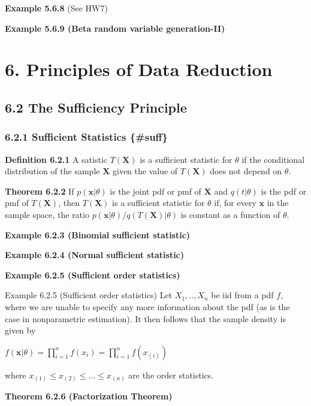 \documentclass[10pt,twocolumn,portrait]{article}
\begin{document}
\textbf{Example 5.6.8} (See HW7)

\textbf{Example 5.6.9 (Beta random variable generation-II)}

\hypertarget{principles-of-data-reduction}{%
\section{6. Principles of Data
Reduction}\label{principles-of-data-reduction}}

\hypertarget{the-sufficiency-principle}{%
\subsection{6.2 The Sufficiency
Principle}\label{the-sufficiency-principle}}

\hypertarget{Facto}{%
\subsubsection{6.2.1 Sufficient Statistics \{\#suff\}}\label{Facto}}

\textbf{Definition 6.2.1} A satistic \(T(\mathbf{X})\) is a sufficient
statistic for \(\theta\) if the conditional distribution of the sample
\(\mathbf{X}\) given the value of \(T(\mathbf{X})\) does not depend on
\(\theta\).

\textbf{Theorem 6.2.2} If \(p(\mathbf{x}|\theta)\) is the joint pdf or
pmf of \(\mathbf{X}\) and \(q(t|\theta)\) is the pdf or pmf of
\(T(\mathbf{X})\), then \(T(\mathbf{X})\) is a sufficient statistic for
\(\theta\) if, for every \(\mathbf{x}\) in the sample space, the ratio
\(p(\mathbf{x}|\theta)/q(T(\mathbf{X})|\theta)\) is constant as a
function of \(\theta\).

\textbf{Example 6.2.3 (Binomial sufficient statistic)}

\textbf{Example 6.2.4 (Normal sufficient statistic)}

\textbf{Example 6.2.5 (Sufficient order statistics)}

Example 6.2.5 (Sufficient order statistics) Let \(X_1,..,X_n\) be iid
from a pdf \(f\), where we are unable to specify any more information
about the pdf (as is the case in nonparametric estimation). It then
follows that the sample density is given by

\(f(\mathbf{x}|\theta)=\prod_{i=1}^nf(x_i)=\prod_{i=1}^nf(x_{(i)})\)

where \(x_{(1)}\le x_{(2)}\le...\le x_{(n)}\) are the order statistics.

\textbf{Theorem 6.2.6 (Factorization Theorem)}
\end{document}
